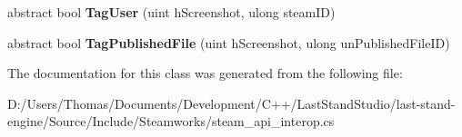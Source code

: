 \begin{DoxyCompactItemize}
\item 
\hypertarget{classValve_1_1Steamworks_1_1ISteamScreenshots_ac9ffb9f3c3743bc81d76b21145fe010d}{}abstract bool {\bfseries Tag\+User} (uint h\+Screenshot, ulong steam\+I\+D)\label{classValve_1_1Steamworks_1_1ISteamScreenshots_ac9ffb9f3c3743bc81d76b21145fe010d}

\item 
\hypertarget{classValve_1_1Steamworks_1_1ISteamScreenshots_a1ebe388e2f10f44c96575f2894543824}{}abstract bool {\bfseries Tag\+Published\+File} (uint h\+Screenshot, ulong un\+Published\+File\+I\+D)\label{classValve_1_1Steamworks_1_1ISteamScreenshots_a1ebe388e2f10f44c96575f2894543824}

\end{DoxyCompactItemize}


The documentation for this class was generated from the following file\+:\begin{DoxyCompactItemize}
\item 
D\+:/\+Users/\+Thomas/\+Documents/\+Development/\+C++/\+Last\+Stand\+Studio/last-\/stand-\/engine/\+Source/\+Include/\+Steamworks/steam\+\_\+api\+\_\+interop.\+cs\end{DoxyCompactItemize}
